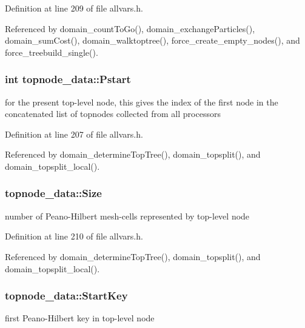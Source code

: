 Definition at line 209 of file allvars.h.



Referenced by domain\_\-countToGo(), domain\_\-exchangeParticles(), domain\_\-sumCost(), domain\_\-walktoptree(), force\_\-create\_\-empty\_\-nodes(), and force\_\-treebuild\_\-single().

\hypertarget{structtopnode__data_abe0b214b3cf372c95a16966304b1592c}{
\subsubsection[{Pstart}]{\setlength{\rightskip}{0pt plus 5cm}int {\bf topnode\_\-data::Pstart}}}
\label{structtopnode__data_abe0b214b3cf372c95a16966304b1592c}
for the present top-\/level node, this gives the index of the first node in the concatenated list of topnodes collected from all processors 

Definition at line 207 of file allvars.h.



Referenced by domain\_\-determineTopTree(), domain\_\-topsplit(), and domain\_\-topsplit\_\-local().

\hypertarget{structtopnode__data_a7a06f0263a5602d4c073100a517892b8}{
\subsubsection[{Size}]{ {\bf topnode\_\-data::Size}}}
\label{structtopnode__data_a7a06f0263a5602d4c073100a517892b8}
number of Peano-\/Hilbert mesh-\/cells represented by top-\/level node 

Definition at line 210 of file allvars.h.



Referenced by domain\_\-determineTopTree(), domain\_\-topsplit(), and domain\_\-topsplit\_\-local().

\hypertarget{structtopnode__data_ab6ae6e924fec05c69ab73ddc2941e855}{
\subsubsection[{StartKey}]{ {\bf topnode\_\-data::StartKey}}}
\label{structtopnode__data_ab6ae6e924fec05c69ab73ddc2941e855}
first Peano-\/Hilbert key in top-\/level node 

